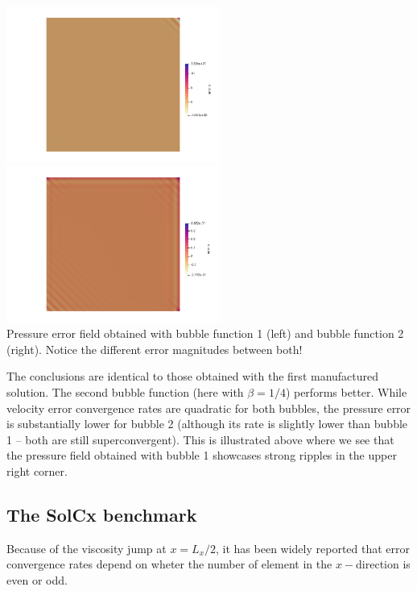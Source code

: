 \begin{center}
\includegraphics[width=7cm]{python_codes/fieldstone_72/results/mms2/error_p1}
\includegraphics[width=7cm]{python_codes/fieldstone_72/results/mms2/error_p2}\\
{\captionfont Pressure error field obtained with bubble function 1 (left) and bubble function 2 (right). Notice the 
different error magnitudes between both!}
\end{center}

The conclusions are identical to those obtained with the first manufactured solution. 
The second bubble function (here with $\beta=1/4$) performs better. While velocity error
convergence rates are quadratic for both bubbles, the pressure error is substantially lower
for bubble 2 (although its rate is slightly lower than bubble 1 -- both are still 
superconvergent). This is illustrated above where we see that the pressure field obtained 
with bubble 1 showcases strong ripples in the upper right corner.     



\subsection*{The SolCx benchmark}

Because of the viscosity jump at $x=L_x/2$, it has been widely reported that 
error convergence rates depend on wheter the number of element in the $x-$direction 
is even or odd.

